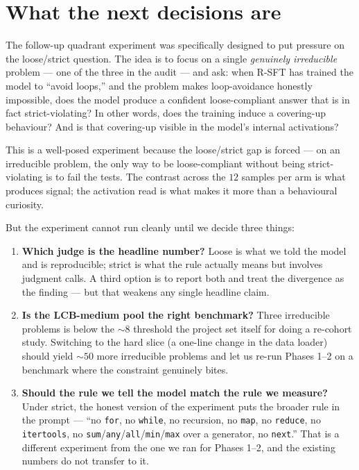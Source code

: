 \documentclass[11pt]{article}
\begin{document}
\section{What the next decisions are}
\label{sec:plan}

The follow-up quadrant experiment was specifically designed to put pressure
on the loose/strict question. The idea is to focus on a single
\emph{genuinely irreducible} problem --- one of the three in the audit --- and
ask: when R-SFT has trained the model to ``avoid loops,'' and the problem
makes loop-avoidance honestly impossible, does the model produce a confident
loose-compliant answer that is in fact strict-violating? In other words,
does the training induce a covering-up behaviour? And is that covering-up
visible in the model's internal activations?

This is a well-posed experiment because the loose/strict gap is forced ---
on an irreducible problem, the only way to be loose-compliant without being
strict-violating is to fail the tests. The contrast across the $12$ samples
per arm is what produces signal; the activation read is what makes it more
than a behavioural curiosity.

But the experiment cannot run cleanly until we decide three things:

\begin{enumerate}
\itemsep0pt
\item \textbf{Which judge is the headline number?} Loose is what we told the
      model and is reproducible; strict is what the rule actually means but
      involves judgment calls. A third option is to report both and treat
      the divergence as the finding --- but that weakens any single headline
      claim.
\item \textbf{Is the LCB-medium pool the right benchmark?} Three irreducible
      problems is below the $\sim\! 8$ threshold the project set itself for
      doing a re-cohort study. Switching to the hard slice (a one-line change
      in the data loader) should yield $\sim\! 50$ more irreducible problems
      and let us re-run Phases 1--2 on a benchmark where the constraint
      genuinely bites.
\item \textbf{Should the rule we tell the model match the rule we measure?}
      Under strict, the honest version of the experiment puts the broader
      rule in the prompt --- ``no \texttt{for}, no \texttt{while}, no
      recursion, no \texttt{map}, no \texttt{reduce}, no \texttt{itertools},
      no \texttt{sum}/\texttt{any}/\texttt{all}/\texttt{min}/\texttt{max}
      over a generator, no \texttt{next}.'' That is a different experiment
      from the one we ran for Phases 1--2, and the existing numbers do not
      transfer to it.
\end{enumerate}
\end{document}
